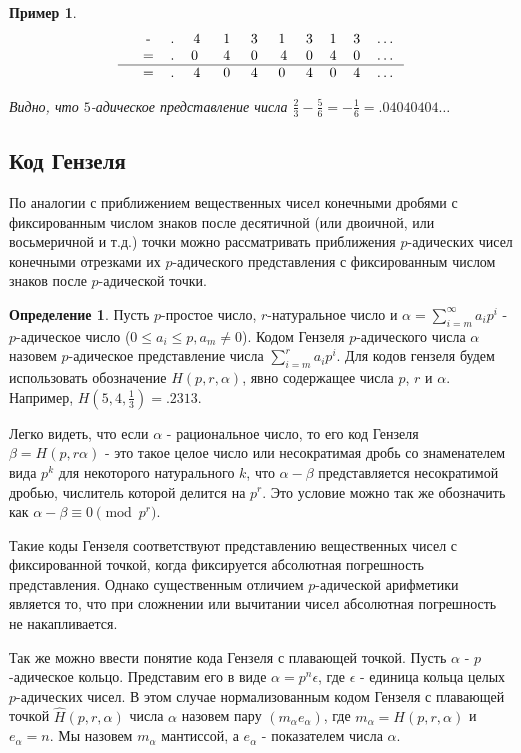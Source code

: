 \documentclass[master, och, diploma, times]{sty/SCWorks}
\theoremstyle{plain}
\newtheorem{exmp}{Пример}[section]
\theoremstyle{definition}
\newtheorem{defn}{Определение}[section]
\begin{document}
\begin{exmp}
$$
\begin{tabular}{cccccccccccc}
& - & . & 4\; & 1\; & 3\; & 1\; & 3 & 1 & 3 & \dots \\
& = & . & 0 \; & 4\; & 0\; & 4 & 0 & 4 & 0 & \dots \\
\hline
& = & . & 4\; & 0\; & 4\; & 0\; & 4 & 0 & 4 & \dots
\end{tabular}
$$

\noindent Видно, что $5$-адическое представление числа $\frac{2}{3} - \frac{5}{6}=-\frac{1}{6}=.04040404\dots$
\end{exmp}



\subsection{Код Гензеля}
По аналогии с приближением вещественных чисел конечными дробями с фиксированным числом знаков после десятичной (или двоичной, или восьмеричной и т.д.) точки можно рассматривать приближения $p$-адических чисел конечными отрезками их $p$-адического представления с фиксированным числом знаков после $p$-адической точки.

\begin{defn}

Пусть $p$-простое число, $r$-натуральное число и $\alpha=\sum\limits^{\infty}_{i=m} a_ip^i$ - $p$-адическое число ($0 \le a_i \le p, a_m \neq 0$). Кодом Гензеля $p$-адического числа $\alpha$ назовем $p$-адическое представление числа $\sum\limits_{i=m}^{r}a_ip^i$. Для кодов гензеля будем использовать обозначение $H(p,r,\alpha)$, явно содержащее числа $p$, $r$ и $\alpha$. Например, $H(5,4,\frac{1}{3})=.2313$.

\end{defn}

Легко видеть, что если $\alpha$ - рациональное число, то его код Гензеля $\beta=H(p,r\alpha)$ - это такое целое число или несократимая дробь со знаменателем вида $p^k$ для некоторого натурального $k$, что $\alpha-\beta$ представляется несократимой дробью, числитель которой делится на $p^r$. Это условие можно так же обозначить как $\alpha - \beta \equiv 0 \pmod {p^r}$.

Такие коды Гензеля соответствуют представлению вещественных чисел с фиксированной точкой, когда фиксируется абсолютная погрешность представления. Однако существенным отличием $p$-адической арифметики является то, что при сложнении или вычитании чисел абсолютная погрешность не накапливается.

Так же можно ввести понятие кода Гензеля с плавающей точкой. Пусть $\alpha$ - $p$-адическое кольцо. Представим его в виде $\alpha=p^n\epsilon$, где $\epsilon$ - единица кольца целых $p$-адических чисел. В этом случае нормализованным кодом Гензеля с плавающей точкой $\hat H (p, r, \alpha)$ числа $\alpha$ назовем пару $(m_{\alpha}e_{\alpha})$, где $m_\alpha = H(p,r,\alpha)$ и $e_\alpha=n$. Мы назовем $m_\alpha$ мантиссой, а $e_\alpha$ - показателем числа $\alpha$.
\end{document}
